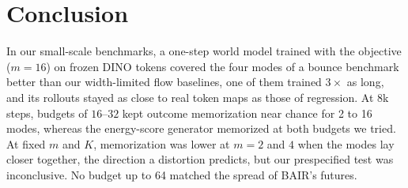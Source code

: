 \section{Conclusion}
\label{sec:conclusion}
In our small-scale benchmarks, a one-step world model trained with the \nom{} objective ($m{=}16$) on frozen DINO tokens covered the four modes of a bounce benchmark better than our width-limited flow baselines, one of them trained $3\times$ as long, and its rollouts stayed as close to real token maps as those of regression. At 8k steps, budgets of $16$--$32$ kept outcome memorization near chance for 2 to 16 modes, whereas the energy-score generator memorized at both budgets we tried. At fixed $m$ and $K$, memorization was lower at $m = 2$ and $4$ when the modes lay closer together, the direction a distortion predicts, but our prespecified test was inconclusive. No budget up to 64 matched the spread of BAIR's futures.
